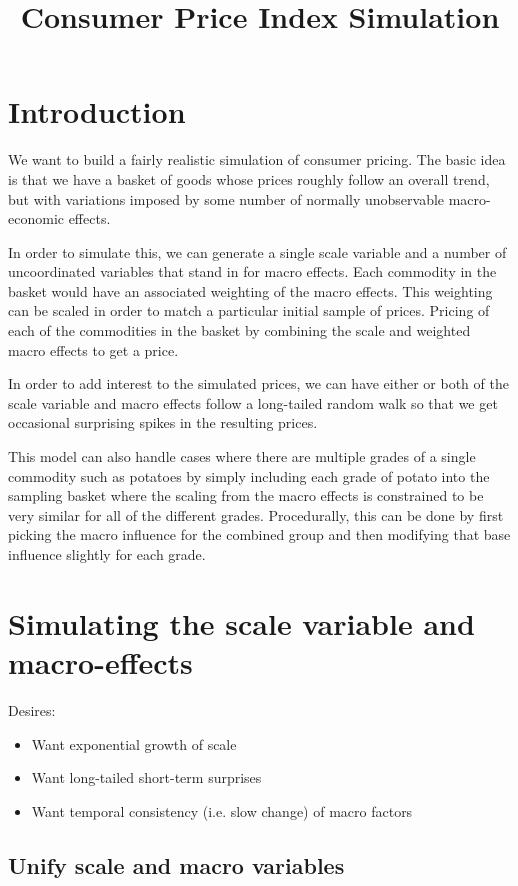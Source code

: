 \documentclass[11pt]{article}
\title{Consumer Price Index Simulation}
\date{}
\begin{document}
\maketitle
\section{Introduction}
We want to build a fairly realistic simulation of consumer pricing. The basic idea is that we have a basket of goods whose prices roughly follow an overall trend, but with variations imposed by some number of normally unobservable macro-economic effects.

In order to simulate this, we can generate a single scale variable and a number of uncoordinated variables that stand in for macro effects. Each commodity in the basket would have an associated weighting of the macro effects. This weighting can be scaled in order to match a particular initial sample of prices. Pricing of each of the commodities in the basket by combining the scale and weighted macro effects to get a price.

In order to add interest to the simulated prices, we can have either or both of the scale variable and macro effects follow a long-tailed random walk so that we get occasional surprising spikes in the resulting prices.

This model can also handle cases where there are multiple grades of a single commodity such as potatoes by simply including each grade of potato into the sampling basket where the scaling from the macro effects is constrained to be very similar for all of the different grades. Procedurally, this can be done by first picking the macro influence for the combined group and then modifying that base influence slightly for each grade.
\section{Simulating the scale variable and macro-effects}
Desires:
\begin{itemize}
\item Want exponential growth of scale
\item Want long-tailed short-term surprises 
\item Want temporal consistency (i.e. slow change) of macro factors
\end{itemize}
\subsection{Unify scale and macro variables}
\end{document}
